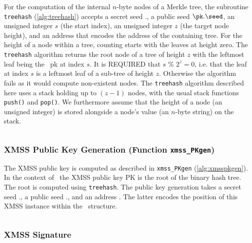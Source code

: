 For the computation of the internal $n$-byte nodes of a Merkle tree, the subroutine \texttt{treehash} (\cref{alg:treehash}) accepts a secret seed \sk.\seed, a public seed $\pk.\seed$, an unsigned integer $s$ (the start index), an unsigned integer $z$ (the target node height), and an address \ADRS that encodes the address of the containing tree. For the height of a node within a tree, counting starts with the leaves at height zero. The \texttt{treehash} algorithm returns the root node of a tree of height $z$ with the leftmost leaf being the \WOTSCS\ pk at index $s$. It is REQUIRED that $s$ \% $2^{z}=0$, i.e. that the leaf at index $s$ is a leftmost leaf of a sub-tree of height $z$. Otherwise the algorithm fails as it would compute non-existent nodes. The \texttt{treehash} algorithm described here uses a stack holding up to $(z-1)$ nodes, with the usual stack functions \texttt{push()} and \texttt{pop()}. We furthermore assume that the height of a node (an unsigned integer) is stored alongside a node's value (an $n$-byte string) on the stack.

\begin{algorithm}
\inputminted[breaklines,linenos,tabsize=2,mathescape,escapeinside=||]{C}{paper/code/treehash.cs}
\caption{\texttt{treehash} --- The TreeHash algorithm.}
\label{alg:treehash}
\end{algorithm}

\subsubsection{XMSS Public Key Generation (Function \texttt{xmss\_PKgen})}

The XMSS public key is computed as described in \texttt{xmss\_PKgen} (\cref{alg:xmsspkgen}). In the context of \SPHINCSA\ the XMSS public key PK is the root of the binary hash tree. The root is computed using \texttt{treehash}. The public key generation takes a secret seed \sk.\seed, a public seed \pk.\seed, and an address \ADRS. The latter encodes the position of this XMSS instance within the \SPHINCSA\ structure.

\begin{algorithm}
    \inputminted[breaklines,linenos,tabsize=2,mathescape,escapeinside=||]{C}{paper/code/xmss_PKgen.cs}
    \caption{\texttt{xmss\_PKgen} --- Generating an XMSS public key.}
    \label{alg:xmsspkgen}
\end{algorithm}

\subsubsection{XMSS Signature}

